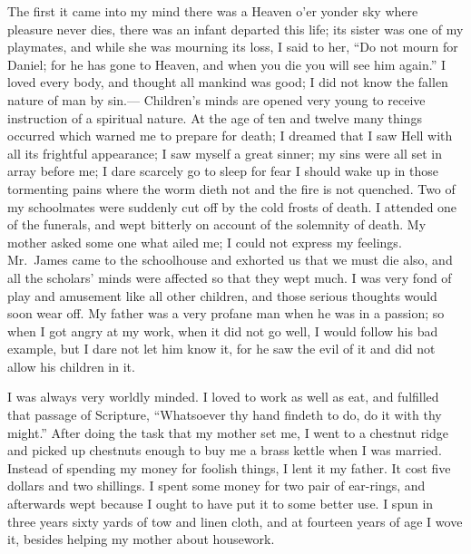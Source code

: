 \documentclass{article}
\begin{document}
The first it came into my mind there was a Heaven o'er yonder sky where pleasure never dies, there was an infant departed this life; its sister was one of my playmates, and while she was mourning its loss, I said to her, ``Do not mourn for Daniel; for he has gone to Heaven, and when you die you will see him again.''
I loved every body, and thought all mankind was good; I did not know the fallen nature of man by sin.---
Children's minds are opened very young to receive instruction of a spiritual nature.
At the age of ten and twelve many things occurred which warned me to prepare for death; I dreamed that I saw Hell with all its frightful appearance; I saw myself a great sinner; my sins were all set in array before me; I dare scarcely go to sleep for fear I should wake up in those tormenting pains where the worm dieth not and the fire is not quenched.
Two of my schoolmates were suddenly cut off by the cold frosts of death.
I attended one of the funerals, and wept bitterly on account of the solemnity of death.
My mother asked some one what ailed me; I could not express my feelings.
Mr.\ James came to the schoolhouse and exhorted us that we must die also, and all the scholars' minds were affected so that they wept much.
I was very fond of play and amusement like all other children, and those serious thoughts would soon wear off.
My father was a very profane man when he was in a passion; so when I got angry at my work, when it did not go well, I would follow his bad example, but I dare not let him know it, for he saw the evil of it and did not allow his children in it.

I was always very worldly minded.
I loved to work as well as eat, and fulfilled that passage of Scripture, ``Whatsoever thy hand findeth to do, do it with thy might.''
After doing the task that my mother set me, I went to a chestnut ridge and picked up chestnuts enough to buy me a brass kettle when I was married.
Instead of spending my money for foolish things, I lent it my father.
It cost five dollars and two shillings.
I spent some money for two pair of ear-rings, and afterwards wept because I ought to have put it to some better use.
I spun in three years sixty yards of tow and linen cloth, and at fourteen years of age I wove it, besides helping my mother about housework.
\end{document}
